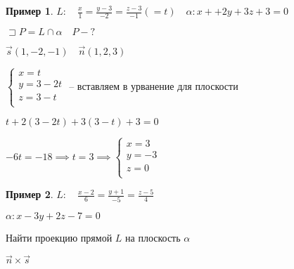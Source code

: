 \documentclass{book}
\theoremstyle{definition}
\newtheorem*{example}{Пример}
\begin{document}
\begin{example}
    $L:\quad \frac{x}{1} = \frac{y-3}{-2} = \frac{z-3}{-1} ( = t)\quad \alpha: x++2y+3z+3 = 0$ 

    $\sqsupset P = L\cap \alpha\quad P -?$

    $\vec s(1, -2, -1)\quad \vec n (1, 2, 3)$

     $\begin{cases}
         x = t\\
         y = 3-2t\\
         z = 3-t\\
     \end{cases}$ -- вставляем в урванение для плоскости

     $t + 2(3-2t)+3(3-t)+3 = 0$

     $-6t = -18 \implies t = 3 \implies \begin{cases}
         x=3\\
         y = -3\\
         z = 0\\
     \end{cases}$


\end{example}

\begin{example}
    $L:\quad \frac{x-2}{6} = \frac{y+1}{-5} = \frac{z-5}{4}$ 

    $\alpha: x-3y + 2z-7 = 0$

    Найти проекцию прямой  $L$ на плоскость  $\alpha$

     $\vec n \times \vec s$
\end{example}
\end{document}
